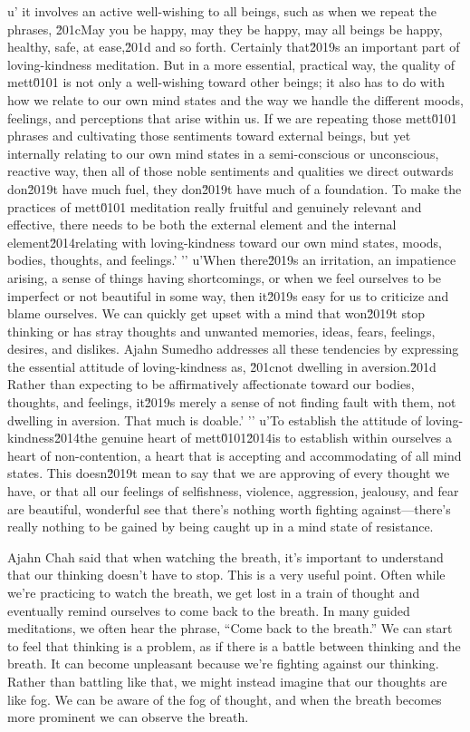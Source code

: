 u' it involves an active well-wishing to all beings, such as when we repeat the phrases, \u201cMay you be happy, may they be happy, may all beings be happy, healthy, safe, at ease,\u201d and so forth. Certainly that\u2019s an important part of loving-kindness meditation. But in a more essential, practical way, the quality of mett\u0101 is not only a well-wishing toward other beings; it also has to do with how we relate to our own mind states and the way we handle the different moods, feelings, and perceptions that arise within us. If we are repeating those mett\u0101 phrases and cultivating those sentiments toward external beings, but yet internally relating to our own mind states in a semi-conscious or unconscious, reactive way, then all of those noble sentiments and qualities we direct outwards don\u2019t have much fuel, they don\u2019t have much of a foundation. To make the practices of mett\u0101 meditation really fruitful and genuinely relevant and effective, there needs to be both the external element and the internal element\u2014relating with loving-kindness toward our own mind states, moods, bodies, thoughts, and feelings.'
'\n'
u'When there\u2019s an irritation, an impatience arising, a sense of things having shortcomings, or when we feel ourselves to be imperfect or not beautiful in some way, then it\u2019s easy for us to criticize and blame ourselves. We can quickly get upset with a mind that won\u2019t stop thinking or has stray thoughts and unwanted memories, ideas, fears, feelings, desires, and dislikes. Ajahn Sumedho addresses all these tendencies by expressing the essential attitude of loving-kindness as, \u201cnot dwelling in aversion.\u201d Rather than expecting to be affirmatively affectionate toward our bodies, thoughts, and feelings, it\u2019s merely a sense of not finding fault with them, not dwelling in aversion. That much is doable.'
'\n'
u'To establish the attitude of loving-kindness\u2014the genuine heart of mett\u0101\u2014is to establish within ourselves a heart of non-contention, a heart that is accepting and accommodating of all mind states. This doesn\u2019t mean to say that we are approving of every thought we have, or that all our feelings of selfishness, violence, aggression, jealousy, and fear are beautiful, wonderful see that there's nothing worth 
fighting against---there's really nothing to be gained by being caught 
up in a mind state of resistance.


Ajahn Chah said that when watching the breath, it's important to 
understand that our thinking doesn't have to stop. This is a very 
useful point. Often while we're practicing to watch the breath, we get 
lost in a train of thought and eventually remind ourselves to come back 
to the breath. In many guided meditations, we often hear the phrase, 
``Come back to the breath.'' We can start to feel that thinking is a 
problem, as if there is a battle between thinking and the breath. It 
can become unpleasant because we're fighting against our thinking. 
Rather than battling like that, we might instead imagine that our 
thoughts are like fog. We can be aware of the fog of thought, and when 
the breath becomes more prominent we can observe the breath.

